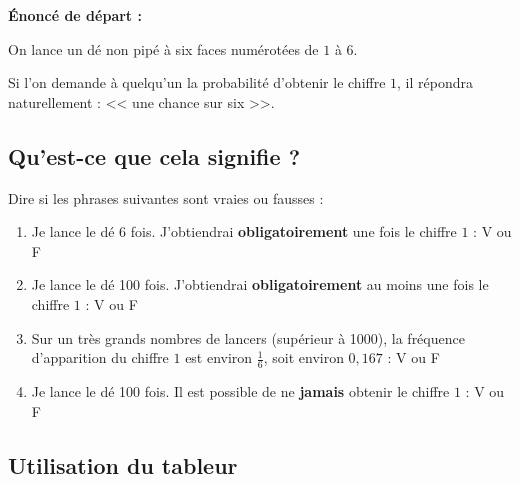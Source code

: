 \documentclass[10pt,french]{article}
\begin{document}

\begin{center}
\end{center}\bigskip

\textbf{\'Enoncé de départ :}\par
On lance un dé non pipé à six faces numérotées de $1$ à $6$.\par
Si l'on demande à quelqu'un la probabilité d'obtenir le chiffre $1$, il répondra naturellement : << une chance sur six >>.

\subsection*{Qu'est-ce que cela signifie ?}

Dire si les phrases suivantes sont vraies ou fausses :
\begin{enumerate}
    \item Je lance le dé 6 fois. J'obtiendrai \textbf{obligatoirement} une fois le chiffre $1$ : V ou F
    \item Je lance le dé 100 fois. J'obtiendrai \textbf{obligatoirement} au moins une fois le chiffre $1$ : V ou F
    \item Sur un très grands nombres de lancers (supérieur à 1000), la fréquence d'apparition du chiffre $1$ est environ $\frac 1 6$, soit environ $0,167$ : V ou F
    \item Je lance le dé 100 fois. Il est possible de ne \textbf{jamais} obtenir le chiffre $1$ : V ou F
\end{enumerate}

\subsection*{Utilisation du tableur}
\end{document}
